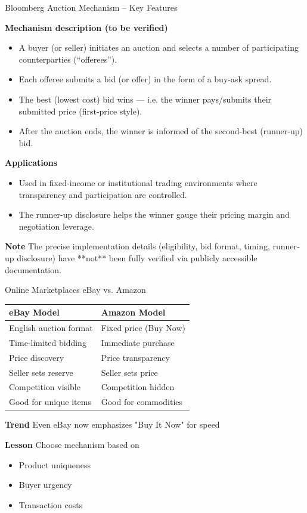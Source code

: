 \documentclass[xcolor={x11names}]{beamer}
\begin{document}
\begin{frame}{Bloomberg Auction Mechanism – Key Features}

\textbf{Mechanism description (to be verified)}
\begin{itemize}
  \item A buyer (or seller) initiates an auction and selects a number of participating counterparties (“offerees”).
  \item Each offeree submits a bid (or offer) in the form of a buy-ask spread.
  \item The best (lowest cost) bid wins — i.e. the winner pays/submits their submitted price (first-price style).
  \item After the auction ends, the winner is informed of the second-best (runner‐up) bid.
\end{itemize}

\textbf{Applications}
\begin{itemize}
  \item Used in fixed-income or institutional trading environments where transparency and participation are controlled.
  \item The runner-up disclosure helps the winner gauge their pricing margin and negotiation leverage.
\end{itemize}

\textbf{Note} The precise implementation details (eligibility, bid format, timing, runner‐up disclosure) have **not** been fully verified via publicly accessible documentation.
\end{frame}


\begin{frame}{Online Marketplaces eBay vs. Amazon}
\begin{center}
\begin{tabular}{p{4.5cm}p{4.5cm}}
\toprule
\textbf{eBay Model} & \textbf{Amazon Model} \\
\midrule
\rowcolor{blue!10}
English auction format & Fixed price (Buy Now) \\
\rowcolor{green!10}
Time-limited bidding & Immediate purchase \\
\rowcolor{blue!10}
Price discovery & Price transparency \\
\rowcolor{green!10}
Seller sets reserve & Seller sets price \\
\rowcolor{blue!10}
Competition visible & Competition hidden \\
\rowcolor{green!10}
Good for unique items & Good for commodities \\
\bottomrule
\end{tabular}
\end{center}


\textbf{Trend} Even eBay now emphasizes "Buy It Now" for speed


\textbf{Lesson} Choose mechanism based on
\begin{itemize}
  \item Product uniqueness
  \item Buyer urgency
  \item Transaction costs
\end{itemize}
\end{frame}
\end{document}
